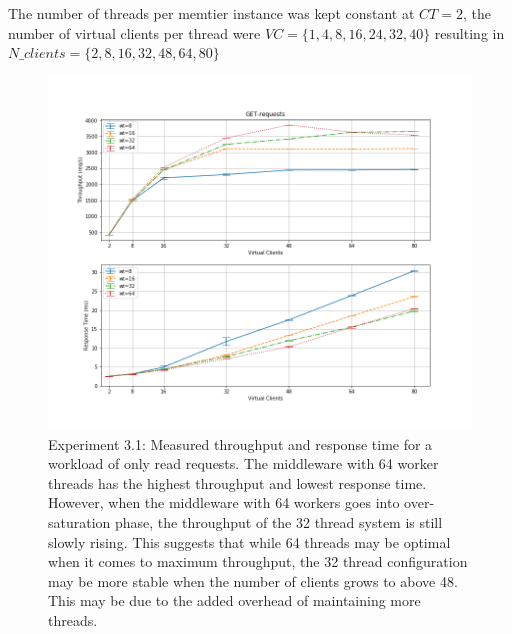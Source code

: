 \documentclass[11pt,a4paper]{article}
\begin{document}
The number of threads per memtier instance was kept constant at $CT=2$, the number of virtual clients per thread were $VC = \{1,4,8,16,24,32,40 \}$ resulting in $N\_clients = \{2,8,16,32,48,64,80\}$

\begin{figure}
\centering
\includegraphics[width=.9\textwidth]{31/31_get_requests}
\caption{Experiment 3.1: Measured throughput and response time for a workload of only read requests. The middleware with 64 worker threads has the highest throughput and lowest response time. However, when the middleware with 64 workers goes into over-saturation phase, the throughput of the 32 thread system is still slowly rising. This suggests that while 64 threads may be optimal when it comes to maximum throughput, the 32 thread configuration may be more stable when the number of clients grows to above 48. This may be due to the added overhead of maintaining more threads.}
\label{fig:31_get}
\end{figure}
\end{document}
